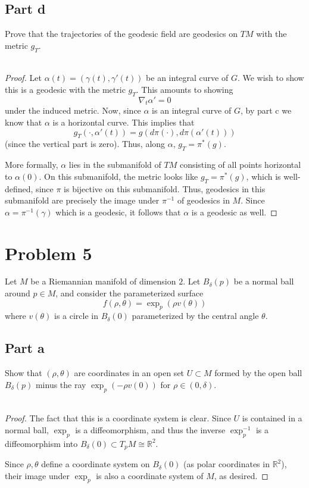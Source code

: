 \documentclass[fontsize=11pt]{scrartcl} %
\numberwithin{equation}{section} %
\numberwithin{figure}{section} %
\numberwithin{table}{section} %
\newcommand{\R}{\mathbb{R}}
\begin{document}
\subsection*{Part d}
Prove that the trajectories of the geodesic field are geodesics on $TM$ with the
metric $g_T$.
\\
\\
\begin{proof}
    Let $\alpha(t) = (\gamma(t),\gamma'(t))$ be an integral curve of $G$. We
    wish to show this is a geodesic with the metric $g_T$. This amounts to
    showing
    \[
        \nabla_t\alpha' = 0
    \]
    under the induced metric. Now, since $\alpha$ is an integral curve of $G$,
    by part c we know that $\alpha$ is a horizontal curve. This implies that
    \[
        g_T(\cdot,\alpha'(t)) = g(d\pi(\cdot),d\pi(\alpha'(t)))
    \]
    (since the vertical part is zero). Thus, along $\alpha$, $g_T = \pi^*(g)$.
    
    More formally, $\alpha$ lies in the submanifold of $TM$ consisting of all
    points horizontal to $\alpha(0)$. On this submanifold, the metric looks like
    $g_T = \pi^*(g)$, which is well-defined, since $\pi$ is bijective on this
    submanifold. Thus, geodesics in this submanifold are precisely the image
    under $\pi^{-1}$ of geodesics in $M$. Since $\alpha = \pi^{-1}(\gamma)$
    which is a geodesic, it follows that $\alpha$ is a geodesic as well.
\end{proof}

\newpage

\section*{Problem 5}
Let $M$ be a Riemannian manifold of dimension $2$. Let $B_{\delta}(p)$ be a
normal ball around $p\in M$, and consider the parameterized surface
\[
    f(\rho,\theta) = \exp_p(\rho v(\theta))
\]
where $v(\theta)$ is a circle in $B_{\delta}(0)$ parameterized by the central
angle $\theta$. 

\subsection*{Part a}
Show that $(\rho,\theta)$ are coordinates in an open set $U\subset M$ formed by
the open ball $B_{\delta}(p)$ minus the ray $\exp_p(-\rho v(0))$ for
$\rho\in(0,\delta)$.
\\
\\
\begin{proof}
    The fact that this is a coordinate system is clear. Since $U$ is contained
    in a normal ball, $\exp_p$ is a diffeomorphism, and thus the inverse
    $\exp_p^{-1}$ is a diffeomorphism into $B_{\delta}(0)\subset T_pM\cong \R^2$.

    Since $\rho,\theta$ define a coordinate system on $B_{\delta}(0)$ (as polar
    coordinates in $\R^2$), their image under $\exp_p$ is also a coordinate
    system of $M$, as desired.
\end{proof}
\end{document}
